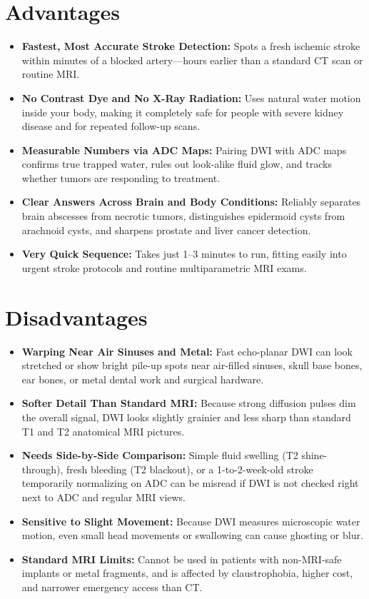 \section{Advantages}
\begin{itemize}
\item \textbf{Fastest, Most Accurate Stroke Detection:} Spots a fresh ischemic stroke within minutes of a blocked artery---hours earlier than a standard CT scan or routine MRI.
\item \textbf{No Contrast Dye and No X-Ray Radiation:} Uses natural water motion inside your body, making it completely safe for people with severe kidney disease and for repeated follow-up scans.
\item \textbf{Measurable Numbers via ADC Maps:} Pairing DWI with ADC maps confirms true trapped water, rules out look-alike fluid glow, and tracks whether tumors are responding to treatment.
\item \textbf{Clear Answers Across Brain and Body Conditions:} Reliably separates brain abscesses from necrotic tumors, distinguishes epidermoid cysts from arachnoid cysts, and sharpens prostate and liver cancer detection.
\item \textbf{Very Quick Sequence:} Takes just 1--3 minutes to run, fitting easily into urgent stroke protocols and routine multiparametric MRI exams.
\end{itemize}

\section{Disadvantages}
\begin{itemize}
\item \textbf{Warping Near Air Sinuses and Metal:} Fast echo-planar DWI can look stretched or show bright pile-up spots near air-filled sinuses, skull base bones, ear bones, or metal dental work and surgical hardware.
\item \textbf{Softer Detail Than Standard MRI:} Because strong diffusion pulses dim the overall signal, DWI looks slightly grainier and less sharp than standard T1 and T2 anatomical MRI pictures.
\item \textbf{Needs Side-by-Side Comparison:} Simple fluid swelling (T2 shine-through), fresh bleeding (T2 blackout), or a 1-to-2-week-old stroke temporarily normalizing on ADC can be misread if DWI is not checked right next to ADC and regular MRI views.
\item \textbf{Sensitive to Slight Movement:} Because DWI measures microscopic water motion, even small head movements or swallowing can cause ghosting or blur.
\item \textbf{Standard MRI Limits:} Cannot be used in patients with non-MRI-safe implants or metal fragments, and is affected by claustrophobia, higher cost, and narrower emergency access than CT.
\end{itemize}

